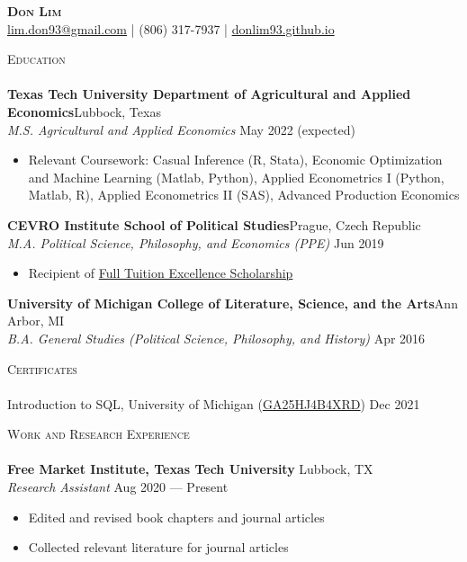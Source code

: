 \documentclass[a4paper,11pt]{article}
\newcommand{\lineunder} {
    \vspace*{-8pt} \\
    \hspace*{-18pt} \hrulefill \\
}
\newcommand{\header} [1] {
    {\hspace*{-18pt}\vspace*{6pt} \textsc{\large{#1}}}
    \vspace*{-6pt} \lineunder
}
\begin{document}
\vspace*{-40pt}

\vspace*{-10pt}
\begin{center}
    {\Huge \scshape \textbf{{Don Lim}}}\\
    \href{mailto:lim.don93@gmail.com}{lim.don93@gmail.com} | (806) 317-7937 | \href{https://donlim93.github.io/}{donlim93.github.io} \\
\end{center}

\header{Education}
\textbf{Texas Tech University Department of Agricultural and Applied Economics}\hfill Lubbock, Texas\\
\textit{M.S. Agricultural and Applied Economics} \hfill May 2022 (expected)\\
\begin{itemize}[noitemsep,nolistsep]
    \item Relevant Coursework: Casual Inference (R, Stata), Economic Optimization and Machine Learning (Matlab, Python), Applied Econometrics I (Python, Matlab, R), Applied Econometrics II (SAS), Advanced Production Economics
\end{itemize}

\textbf{CEVRO Institute School of Political Studies}\hfill Prague, Czech Republic\\
\textit{M.A. Political Science, Philosophy, and Economics (PPE)} \hfill Jun 2019\\
\begin{itemize}[noitemsep,nolistsep]
    \item Recipient of \href{http://www.cevroinstitut.cz/en/article/scholarships/}{Full Tuition Excellence Scholarship}
\end{itemize}

\textbf{University of Michigan College of Literature, Science, and the Arts}\hfill Ann Arbor, MI\\
\textit{B.A. General Studies (Political Science, Philosophy, and History)} \hfill Apr 2016\\

\vspace{1mm}
\header{Certificates}


Introduction to SQL, University of Michigan (\href{https://coursera.org/verify/GA25HJ4B4XRD}{GA25HJ4B4XRD}) \hfill Dec 2021

\vspace{1mm}
\header{Work and Research Experience}
\textbf{Free Market Institute, Texas Tech University} \hfill Lubbock, TX\\
\textit{Research Assistant} \hfill Aug 2020 --- Present \\
\begin{itemize}[noitemsep,nolistsep]
    \item Edited and revised book chapters and journal articles
    \item Collected relevant literature for journal articles
\end{itemize}
\end{document}

